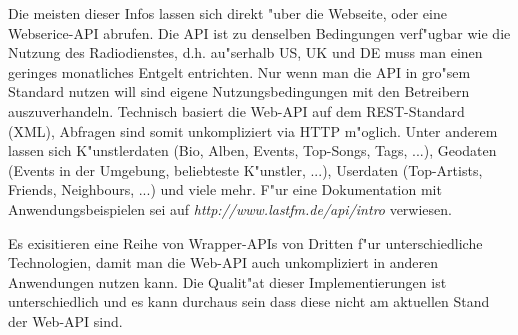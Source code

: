 Die meisten dieser Infos lassen sich direkt "uber die Webseite, oder eine Webserice-API abrufen. Die API ist zu denselben Bedingungen verf"ugbar wie die Nutzung des Radiodienstes, d.h. au"serhalb US, UK und DE muss man einen geringes monatliches Entgelt entrichten. Nur wenn man die API in gro"sem Standard nutzen will sind eigene Nutzungsbedingungen mit den Betreibern auszuverhandeln.
Technisch basiert die Web-API auf dem REST-Standard (XML), Abfragen sind somit unkompliziert via HTTP m"oglich. Unter anderem lassen sich K"unstlerdaten (Bio, Alben, Events, Top-Songs, Tags, ...), Geodaten (Events in der Umgebung, beliebteste K"unstler, ...), Userdaten (Top-Artists, Friends, Neighbours, ...) und viele mehr. F"ur eine Dokumentation mit Anwendungsbeispielen sei auf \textit{http://www.lastfm.de/api/intro} verwiesen. 

Es exisitieren eine Reihe von Wrapper-APIs von Dritten f"ur unterschiedliche Technologien, damit man die Web-API auch unkompliziert in anderen Anwendungen nutzen kann. Die Qualit"at dieser Implementierungen ist unterschiedlich und es kann durchaus sein dass diese nicht am aktuellen Stand der Web-API sind. 

